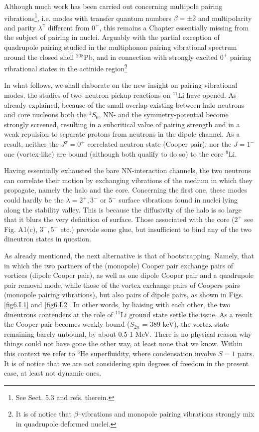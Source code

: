 \begin{subappendices}
Although much work has been carried out concerning multipole pairing vibrations\footnote{See \cite{Brink:05} Sect. 5.3 and refs. therein.}, i.e. modes with transfer quantum numbers $\beta=\pm2$ and multipolarity and parity $\lambda^\pi$ different from $0^+$, this remains a Chapter essentially missing from the subject of pairing in nuclei. Arguably with the partial exception of quadrupole pairing studied in the multiphonon pairing vibrational spectrum around the closed shell $^{208}$Pb, and in connection with strongly excited $0^+$ pairing vibrational states in the actinide region\footnote{It is of notice that $\beta$--vibrations and monopole pairing vibrations strongly mix in quadrupole deformed nuclei.}

In what follows, we shall elaborate on the new insight on pairing vibrational modes, the studies of two--neutron pickup reactions on $^{11}$Li have opened. As already explained, because of the small overlap existing between halo neutrons and core nucleons both the $^1S_0$, NN- and the symmetry-potential become strongly screened, resulting in a subcritical value of pairing strength and in a weak repulsion to separate protons from neutrons in the dipole channel.
As a result, neither the $J^{\pi}=0^+$ correlated neutron state  (Cooper pair), nor the $J=1^-$ one (vortex-like) are bound 
(although both qualify to do so) to the core $^{9}$Li. 


Having essentially exhausted the bare NN-interaction channels, the two neutrons can correlate their motion by exchanging vibrations of the medium in which they propagate, namely  the halo and the core. Concerning the first one, these modes could hardly  be the $\lambda= 2^+,3^-$ or $5^-$ surface vibrations found in 
nuclei lying along the  stability valley. This is because the diffusivity of the halo is so large that it blurs the very definition of surface. Those associated with  the core ($ 2^+$ see Fig. A1(c), $3^-,5^-$ etc.) provide some glue, but insufficient to bind any of the two dineutron states in question.

As already mentioned, the next alternative is that of bootstrapping. Namely, that in which the two partners of the  (monopole) Cooper pair exchange  pairs of vortices 
(dipole Cooper pair),  as well as one dipole Cooper pair and a quadrupole pair removal mode,
while those of the vortex exchange  pairs of Coopers pairs (monopole pairing vibrations), but also pairs of dipole pairs, as shown in Figs. \ref{fig6.I.1} and \ref{fig6.I.2}.  In other words, by  liaising  with each other,  
the two dineutrons contenders at the role of $^{11}$Li ground state  settle the issue.  As a result  the Cooper pair becomes weakly bound ($S_{2n}$ = 389 keV), the vortex state remaining barely unbound, by about 0.5-1 MeV.
There is no physical reason why things could not have gone  the other way, at least none that we know. Within this context we refer to $^3$He superfluidity, where condensation involve $S=1$ pairs. It is of notice that we are not considering spin degrees of freedom in  the present case,
at least  not dynamic ones. 


\end{subappendices}
